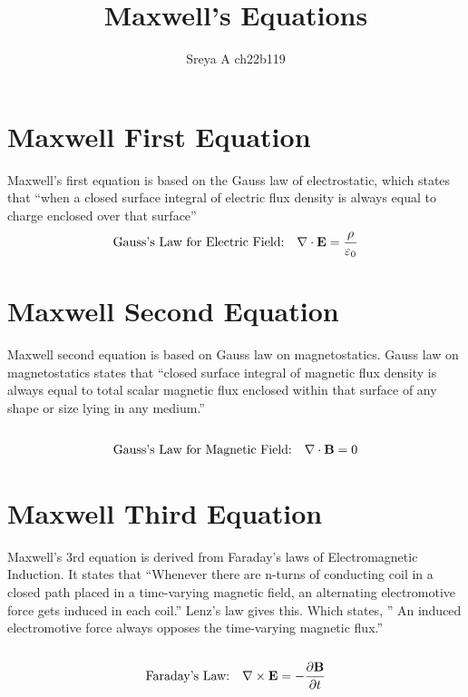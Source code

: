 \documentclass{article}
\title{Maxwell's Equations}
\author{Sreya A ch22b119}
\begin{document}
\maketitle

\section{Maxwell First Equation}
Maxwell’s first equation is based on the Gauss law of electrostatic, which states that “when a closed surface integral of electric flux density is always equal to charge enclosed over that surface”\\

\begin{align*}
\parindent 0px
\text{Gauss's Law for Electric Field:} \quad & \nabla \cdot \mathbf{E} = \frac{\rho}{\varepsilon_0} \\
\end{align*}

\section{Maxwell Second Equation}
Maxwell second equation is based on Gauss law on magnetostatics.
Gauss law on magnetostatics states that “closed surface integral of magnetic flux density is always equal to total scalar magnetic flux enclosed within that surface of any shape or size lying in any medium.”\\\\
\begin{align*}
\parindent 0px
    \text{Gauss's Law for Magnetic Field:} \quad & \nabla \cdot \mathbf{B} = 0 \\
\end{align*}

\section{Maxwell Third Equation}
Maxwell’s 3rd equation is derived from Faraday’s laws of Electromagnetic Induction. It states that “Whenever there are n-turns of conducting coil in a closed path placed in a time-varying magnetic field, an alternating electromotive force gets induced in each coil.” Lenz’s law gives this. Which states, ” An induced electromotive force always opposes the time-varying magnetic flux.”\\\\
\begin{align*}
\parindent 0px
    \text{Faraday's Law:} \quad & \nabla \times \mathbf{E} = -\frac{\partial \mathbf{B}}{\partial t} \\
\end{align*}
\end{document}
